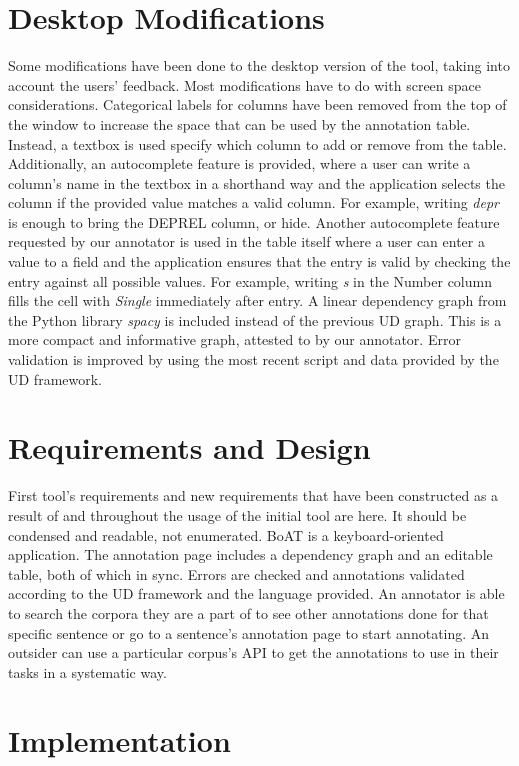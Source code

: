 \documentclass[
]{ceurart}
\begin{document}
\section{Desktop Modifications}

Some modifications have been done to the desktop version of the tool, taking into account the users' feedback. Most modifications have to do with screen space considerations.
Categorical labels for columns have been removed from the top of the window to increase the space that can be used by the annotation table. Instead, a textbox is used specify which column to add or remove from the table. Additionally, an autocomplete feature is provided, where a user can write a column's name in the textbox in a shorthand way and the application selects the column if the provided value matches a valid column. For example, writing \textit{depr} is enough to bring the DEPREL column, or hide.
Another autocomplete feature requested by our annotator is used in the table itself where a user can enter a value to a field and the application ensures that the entry is valid by checking the entry against all possible values. For example, writing \textit{s} in the Number column fills the cell with \textit{Single} immediately after entry.
A linear dependency graph from the Python library \textit{spacy} is included instead of the previous UD graph. This is a more compact and informative graph, attested to by our annotator.
Error validation is improved by using the most recent script and data provided by the UD framework.

\section{Requirements and Design}

First tool's requirements and new requirements that have been constructed as a result of and throughout the usage of the initial tool are here. It should be condensed and readable, not enumerated.
BoAT is a keyboard-oriented application. The annotation page includes a dependency graph and an editable table, both of which in sync. Errors are checked and annotations validated according to the UD framework and the language provided.
An annotator is able to search the corpora they are a part of to see other annotations done for that specific sentence or go to a sentence's annotation page to start annotating.
An outsider can use a particular corpus's API to get the annotations to use in their tasks in a systematic way.

\section{Implementation}
\end{document}
